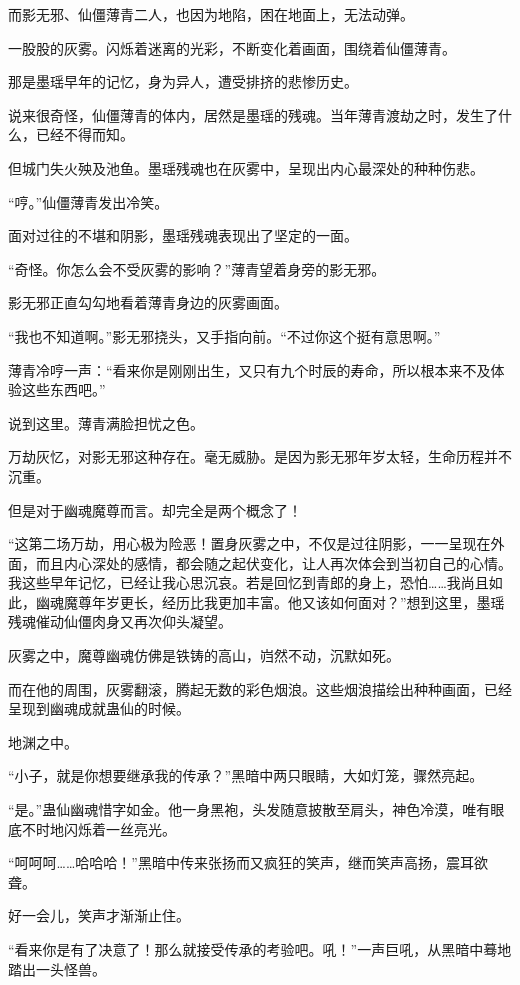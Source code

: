 \begin{this_body}
而影无邪、仙僵薄青二人，也因为地陷，困在地面上，无法动弹。

一股股的灰雾。闪烁着迷离的光彩，不断变化着画面，围绕着仙僵薄青。

那是墨瑶早年的记忆，身为异人，遭受排挤的悲惨历史。

说来很奇怪，仙僵薄青的体内，居然是墨瑶的残魂。当年薄青渡劫之时，发生了什么，已经不得而知。

但城门失火殃及池鱼。墨瑶残魂也在灰雾中，呈现出内心最深处的种种伤悲。

“哼。”仙僵薄青发出冷笑。

面对过往的不堪和阴影，墨瑶残魂表现出了坚定的一面。

“奇怪。你怎么会不受灰雾的影响？”薄青望着身旁的影无邪。

影无邪正直勾勾地看着薄青身边的灰雾画面。

“我也不知道啊。”影无邪挠头，又手指向前。“不过你这个挺有意思啊。”

薄青冷哼一声：“看来你是刚刚出生，又只有九个时辰的寿命，所以根本来不及体验这些东西吧。”

说到这里。薄青满脸担忧之色。

万劫灰忆，对影无邪这种存在。毫无威胁。是因为影无邪年岁太轻，生命历程并不沉重。

但是对于幽魂魔尊而言。却完全是两个概念了！

“这第二场万劫，用心极为险恶！置身灰雾之中，不仅是过往阴影，一一呈现在外面，而且内心深处的感情，都会随之起伏变化，让人再次体会到当初自己的心情。我这些早年记忆，已经让我心思沉哀。若是回忆到青郎的身上，恐怕……我尚且如此，幽魂魔尊年岁更长，经历比我更加丰富。他又该如何面对？”想到这里，墨瑶残魂催动仙僵肉身又再次仰头凝望。

灰雾之中，魔尊幽魂仿佛是铁铸的高山，岿然不动，沉默如死。

而在他的周围，灰雾翻滚，腾起无数的彩色烟浪。这些烟浪描绘出种种画面，已经呈现到幽魂成就蛊仙的时候。

地渊之中。

“小子，就是你想要继承我的传承？”黑暗中两只眼睛，大如灯笼，骤然亮起。

“是。”蛊仙幽魂惜字如金。他一身黑袍，头发随意披散至肩头，神色冷漠，唯有眼底不时地闪烁着一丝亮光。

“呵呵呵……哈哈哈！”黑暗中传来张扬而又疯狂的笑声，继而笑声高扬，震耳欲聋。

好一会儿，笑声才渐渐止住。

“看来你是有了决意了！那么就接受传承的考验吧。吼！”一声巨吼，从黑暗中蓦地踏出一头怪兽。


\end{this_body}
